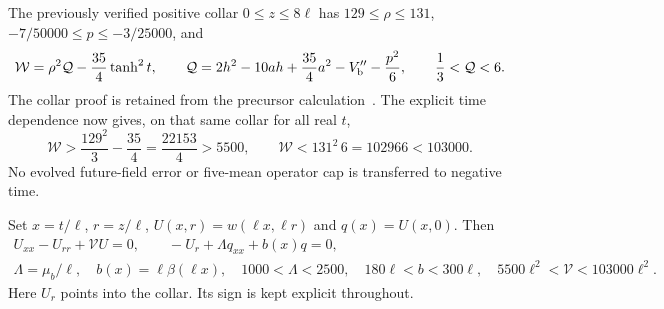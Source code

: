 \documentclass[11pt]{article}
\begin{document}
The previously verified positive collar $0\le z\le8\ell$ has
$129\le\rho\le131$, $-7/50000\le p\le-3/25000$, and
\begin{equation}
 \mathcal W=\rho^2\mathcal Q-\frac{35}{4}\tanh^2t,\qquad
 \mathcal Q=2h^2-10ah+\frac{35}{4}a^2-V_{\rm b}''-\frac{p^2}{6},
 \qquad \frac13<\mathcal Q<6.
 \label{eq:potential}
\end{equation}
The collar proof is retained from the precursor calculation~\cite{precursor}.
The explicit time dependence now gives, on that same collar for all real $t$,
\begin{equation}
 \mathcal W>\frac{129^2}{3}-\frac{35}{4}
         =\frac{22153}{4}>5500,\qquad
 \mathcal W<131^2\,6=102966<103000.
 \label{eq:potentialcaps}
\end{equation}
No evolved future-field error or five-mean operator cap is transferred
to negative time.

Set $x=t/\ell$, $r=z/\ell$, $U(x,r)=w(\ell x,\ell r)$ and $q(x)=U(x,0)$.
Then
\begin{equation}
\begin{gathered}
 U_{xx}-U_{rr}+\mathcal VU=0,\qquad
 -U_r+\Lambda q_{xx}+b(x)q=0,\\
 \Lambda=\mu_b/\ell,\quad b(x)=\ell\beta(\ell x),\quad
 1000<\Lambda<2500,\quad180\ell<b<300\ell,\quad
 5500\ell^2<\mathcal V<103000\ell^2 .
\end{gathered}
\label{eq:scaled}
\end{equation}
Here $U_r$ points into the collar. Its sign is kept explicit throughout.
\end{document}
